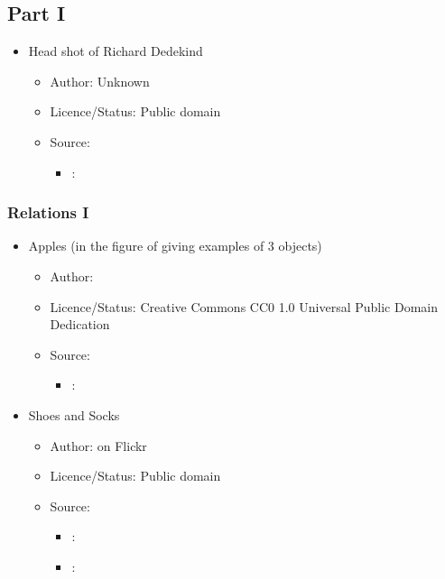 \subsection*{Part I}
\begin{itemize}
    \item Head shot of Richard Dedekind
    \begin{itemize}
        \item Author: Unknown
        \item Licence/Status: Public domain
        \item Source: 
        \begin{itemize}
            \item {}: 
        \end{itemize}
    \end{itemize}
\end{itemize}

\subsubsection*{Relations I}
\begin{itemize}
    \item Apples (in the figure of giving examples of 3 objects)
    \begin{itemize}
        \item Author: 
        \item Licence/Status: Creative Commons CC0 1.0 Universal Public Domain Dedication
        \item Source: 
        \begin{itemize}
            \item {}: 
        \end{itemize}
    \end{itemize}
    \item Shoes and Socks
    \begin{itemize}
        \item Author:  on Flickr
        \item Licence/Status: Public domain
        \item Source: 
        \begin{itemize}
            \item {}: 
            \item {}: 
        \end{itemize}
    \end{itemize}
\end{itemize}

